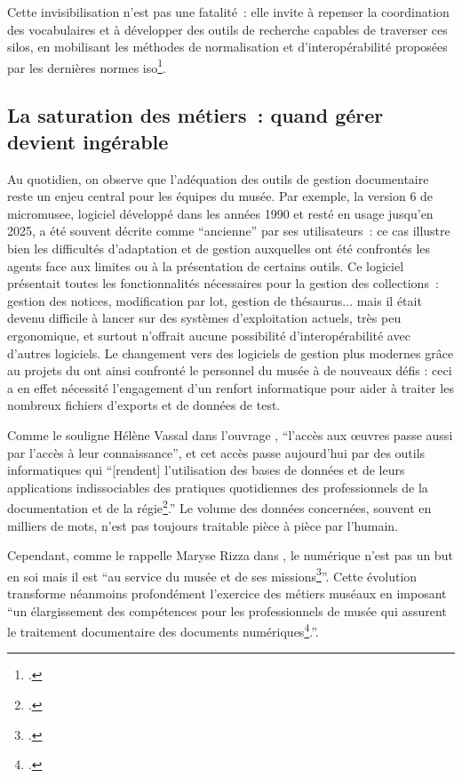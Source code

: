 Cette invisibilisation n’est pas une fatalité~: elle invite à repenser la coordination des vocabulaires et à développer des outils de recherche capables de traverser ces silos, en mobilisant les méthodes de normalisation et d’interopérabilité proposées par les dernières normes \gls{iso}\footcite{chichereauNormesConceptionGestion2007}.

\subsection{La saturation des métiers~: quand gérer devient ingérable}

Au quotidien, on observe que l’adéquation des outils de gestion documentaire reste un enjeu central pour les équipes du musée. Par exemple, la version 6 de \gls{micromusee}, logiciel développé dans les années 1990 et resté en usage jusqu’en 2025, a été souvent décrite comme \enquote{ancienne} par ses utilisateurs~: ce cas illustre bien les difficultés d’adaptation et de gestion auxquelles ont été confrontés les agents face aux limites ou à la présentation de certains outils. Ce logiciel présentait toutes les fonctionnalités nécessaires pour la gestion des collections~: gestion des notices, modification par lot, gestion de thésaurus... mais il était devenu difficile à lancer sur des systèmes d’exploitation actuels, très peu ergonomique, et surtout n’offrait aucune possibilité d’interopérabilité avec d’autres logiciels. Le changement vers des logiciels de gestion plus modernes grâce au projets du \minarm ont ainsi confronté le personnel du musée à de nouveaux défis : ceci a en effet nécessité l’engagement d’un renfort informatique pour aider à traiter les nombreux fichiers d'exports et de données de test.

Comme le souligne Hélène Vassal dans l'ouvrage , \enquote{l’accès aux œuvres passe aussi par l’accès à leur connaissance}, et cet accès passe aujourd’hui par des outils informatiques qui \enquote{[rendent] l’utilisation des bases de données et de leurs applications indissociables des pratiques quotidiennes des professionnels de la documentation et de la régie\footcite{merleau-pontyDocumenterCollectionsMusees2016}.} Le volume des données concernées, souvent en milliers de mots, n’est pas toujours traitable pièce à pièce par l’humain.

Cependant, comme le rappelle Maryse Rizza dans \textit{}, le numérique n’est pas un but en soi mais il est \enquote{au service du musée et de ses missions\footcite{ricardRGPDArchives2018a}}. Cette évolution transforme néanmoins profondément l’exercice des métiers muséaux en imposant \enquote{un élargissement des compétences pour les professionnels de musée qui assurent le traitement documentaire des documents numériques\footcite{rizzaDocumentAuCoeur2014}.}.

